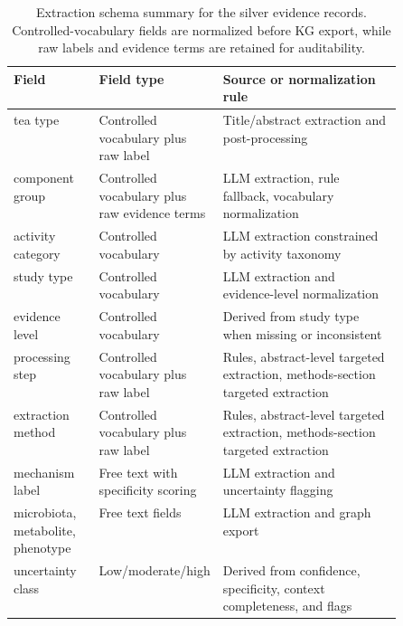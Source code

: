 \begin{table}[htbp]
\centering
\footnotesize
\caption{Extraction schema summary for the silver evidence records. Controlled-vocabulary fields are normalized before KG export, while raw labels and evidence terms are retained for auditability.}
\label{tab:extraction_schema_summary}
\begin{tabularx}{\linewidth}{p{0.22\linewidth}p{0.28\linewidth}X}
\toprule
Field & Field type & Source or normalization rule \\
\midrule
tea type & Controlled vocabulary plus raw label & Title/abstract extraction and post-processing \\
component group & Controlled vocabulary plus raw evidence terms & LLM extraction, rule fallback, vocabulary normalization \\
activity category & Controlled vocabulary & LLM extraction constrained by activity taxonomy \\
study type & Controlled vocabulary & LLM extraction and evidence-level normalization \\
evidence level & Controlled vocabulary & Derived from study type when missing or inconsistent \\
processing step & Controlled vocabulary plus raw label & Rules, abstract-level targeted extraction, methods-section targeted extraction \\
extraction method & Controlled vocabulary plus raw label & Rules, abstract-level targeted extraction, methods-section targeted extraction \\
mechanism label & Free text with specificity scoring & LLM extraction and uncertainty flagging \\
microbiota, metabolite, phenotype & Free text fields & LLM extraction and graph export \\
uncertainty class & Low/moderate/high & Derived from confidence, specificity, context completeness, and flags \\
\bottomrule
\end{tabularx}
\end{table}
